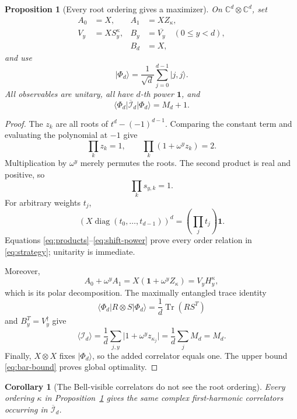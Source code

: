 \documentclass[11pt]{article}
\newtheorem{proposition}[theorem]{Proposition}
\newtheorem{corollary}[theorem]{Corollary}
\theoremstyle{remark}
\newcommand{\Id}{\mathbf 1}
\newcommand{\cI}{\mathcal I}
\newcommand{\Tr}{\operatorname{Tr}}
\newcommand{\bbC}{\mathbb C}
\begin{document}
\begin{proposition}[Every root ordering gives a maximizer]
\label{prop:maximizer}
On \(\bbC^d\otimes\bbC^d\), set
\begin{equation}
\begin{aligned}
 A_0&=X,& A_1&=XZ_\kappa,\\
 V_y&=XS_y^\kappa,& B_y&=\overline{V_y}\quad(0\leq y<d),\\
 && B_d&=X,
\end{aligned}
\label{eq:strategy}
\end{equation}
and use
\[
  \lvert\Phi_d\rangle
  =\frac1{\sqrt d}\sum_{j=0}^{d-1}\lvert j,j\rangle.
\]
All observables are unitary, all have \(d\)-th power \(\Id\), and
\[
  \langle\Phi_d\vert\overline{\cI}_d\vert\Phi_d\rangle=M_d+1.
\]
\end{proposition}

\begin{proof}
The \(z_k\) are all roots of \(t^d-(-1)^{d-1}\).  Comparing the constant
term and evaluating the polynomial at \(-1\) give
\begin{equation}
  \prod_kz_k=1,\qquad
  \prod_k(1+\omega^yz_k)=2.
  \label{eq:products}
\end{equation}
Multiplication by \(\omega^y\) merely permutes the roots.  The second product
is real and positive, so
\[
  \prod_ks_{y,k}=1.
\]
For arbitrary weights \(t_j\),
\begin{equation}
  \left(X\operatorname{diag}(t_0,\ldots,t_{d-1})\right)^d
  =\left(\prod_jt_j\right)\Id.
  \label{eq:shift-power}
\end{equation}
Equations \eqref{eq:products}--\eqref{eq:shift-power} prove every order
relation in \eqref{eq:strategy}; unitarity is immediate.

Moreover,
\[
  A_0+\omega^yA_1
  =X(\Id+\omega^yZ_\kappa)
  =V_yH_y^\kappa,
\]
which is its polar decomposition.  The maximally entangled trace identity
\[
  \langle\Phi_d\vert R\otimes S\vert\Phi_d\rangle
  =\frac1d\Tr(RS^T)
\]
and \(B_y^T=V_y^\dagger\) give
\[
  \langle\cI_d\rangle
  =\frac1d\sum_{j,y}\lvert1+\omega^yz_{\kappa_j}\rvert
  =\frac1d\sum_jM_d=M_d.
\]
Finally, \(X\otimes X\) fixes \(\lvert\Phi_d\rangle\), so the added
correlator equals one.  The upper bound \eqref{eq:bar-bound} proves global
optimality.
\end{proof}

\begin{corollary}[The Bell-visible correlators do not see the root ordering]
\label{cor:visible}
Every ordering \(\kappa\) in Proposition~\ref{prop:maximizer} gives the same
complex first-harmonic correlators occurring in
\(\overline{\cI}_d\).
\end{corollary}
\end{document}
